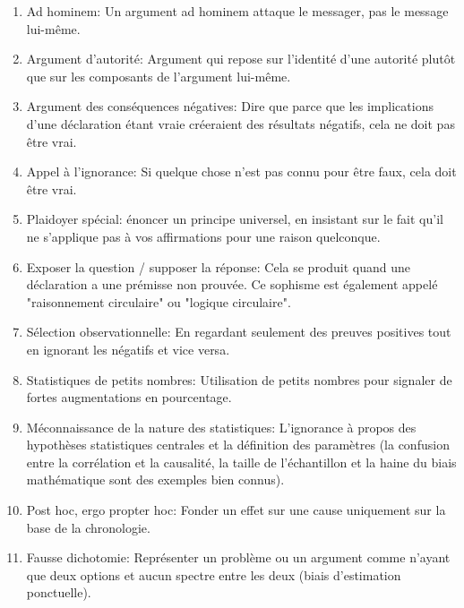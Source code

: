 	\begin{enumerate}
		\item Ad hominem: Un argument ad hominem attaque le messager, pas le message lui-même.

		\item Argument d'autorit\'e: Argument qui repose sur l'identit\'e d'une autorit\'e plutôt que sur les composants de l'argument lui-même.

		\item Argument des cons\'equences n\'egatives: Dire que parce que les implications d'une d\'eclaration \'etant vraie cr\'eeraient des r\'esultats n\'egatifs, cela ne doit pas être vrai.

		\item Appel à l'ignorance: Si quelque chose n'est pas connu pour être faux, cela doit être vrai.

		\item Plaidoyer sp\'ecial: \'enoncer un principe universel, en insistant sur le fait qu'il ne s'applique pas à vos affirmations pour une raison quelconque.

		\item Exposer la question / supposer la r\'eponse: Cela se produit quand une d\'eclaration a une pr\'emisse non prouv\'ee. Ce sophisme est \'egalement appel\'e "raisonnement circulaire" ou "logique circulaire".

		\item S\'election observationnelle: En regardant seulement des preuves positives tout en ignorant les n\'egatifs et vice versa.

		\item Statistiques de petits nombres: Utilisation de petits nombres pour signaler de fortes augmentations en pourcentage.

		\item M\'econnaissance de la nature des statistiques: L'ignorance à propos des hypothèses statistiques centrales et la d\'efinition des paramètres (la confusion entre la corr\'elation et la causalit\'e, la taille de l'\'echantillon et la haine du biais math\'ematique sont des exemples bien connus).

		\item Post hoc, ergo propter hoc: Fonder un effet sur une cause uniquement sur la base de la chronologie.

		\item Fausse dichotomie: Repr\'esenter un problème ou un argument comme n'ayant que deux options et aucun spectre entre les deux (biais d'estimation ponctuelle).


\end{enumerate}
